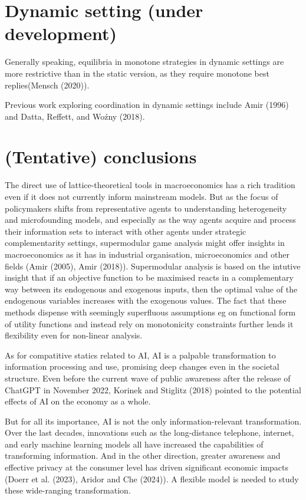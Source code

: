 \documentclass[
]{article}
\theoremstyle{definition}
\theoremstyle{plain}
\theoremstyle{remark}
\begin{document}
\section{Dynamic setting (under
development)}\label{dynamic-setting-under-development}

Generally speaking, equilibria in monotone strategies in dynamic
settings are more restrictive than in the static version, as they
require monotone best replies(Mensch (2020)).

Previous work exploring coordination in dynamic settings include Amir
(1996) and Datta, Reffett, and Woźny (2018).

\section{(Tentative) conclusions}\label{tentative-conclusions}

The direct use of lattice-theoretical tools in macroeconomics has a rich
tradition even if it does not currently inform mainstream models. But as
the focus of policymakers shifts from representative agents to
understanding heterogeneity and microfounding models, and especially as
the way agents acquire and process their information sets to interact
with other agents under strategic complementarity settings, supermodular
game analysis might offer insights in macroeconomics as it has in
industrial organisation, microeconomics and other fields (Amir (2005),
Amir (2018)). Supermodular analysis is based on the intutive insight
that if an objective function to be maximised reacts in a complementary
way between its endogenous and exogenous inputs, then the optimal value
of the endogenous variables increases with the exogenous values. The
fact that these methods dispense with seemingly superfluous assumptions
eg on functional form of utility functions and instead rely on
monotonicity constraints further lends it flexibility even for
non-linear analysis.

As for compatitive statics related to AI, AI is a palpable
transformation to information processing and use, promising deep changes
even in the societal structure. Even before the current wave of public
awareness after the release of ChatGPT in November 2022, Korinek and
Stiglitz (2018) pointed to the potential effects of AI on the economy as
a whole.

But for all its importance, AI is not the only information-relevant
transformation. Over the last decades, innovations such as the
long-distance telephone, internet, and early machine learning models all
have increased the capabilities of transforming information. And in the
other direction, greater awareness and effective privacy at the consumer
level has driven significant economic impacts (Doerr et al. (2023),
Aridor and Che (2024)). A flexible model is needed to study these
wide-ranging transformation.
\end{document}
